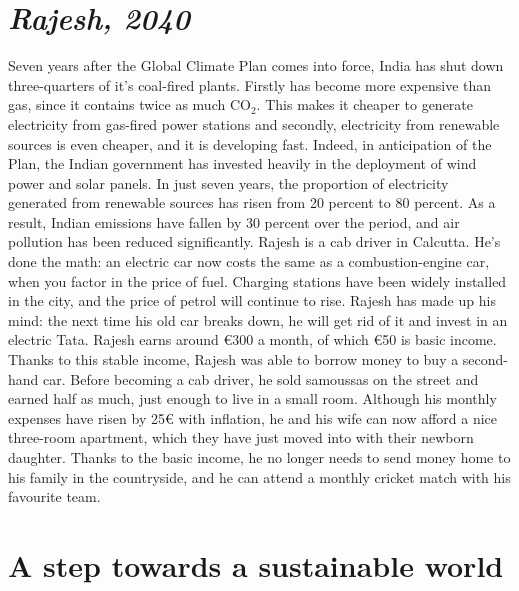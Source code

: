 \documentclass[a5paper,english,openany]{memoir}
\begin{document}
\chapter*{\textit{Rajesh, 2040}}\label{ch:narr_kolkata2}
Seven years after the Global Climate Plan comes into force,  India has shut down three-quarters of it's coal-fired plants. %
Firstly %
has become %
more expensive than gas, since it contains twice as much CO$_\text{2}$. This makes it cheaper to generate electricity from gas-fired power stations and secondly, %
electricity from renewable sources is even cheaper, and it is developing fast. Indeed, in anticipation of the Plan, the Indian government has invested heavily in the deployment of wind power and solar panels. In just seven years, the proportion of electricity generated from renewable sources has risen from 20 percent to 80 percent. As a result, Indian emissions have fallen by 30 percent over the period, and air pollution has been reduced significantly.
Rajesh is a cab driver in Calcutta. He's done the math: an electric car now costs the same as a combustion-engine car, when you factor in the price of fuel. Charging stations have been widely installed in the city, and the price of petrol will continue to rise. Rajesh has made up his mind: the next time his old car breaks down, he will get rid of it and invest in an electric Tata. Rajesh earns around \euro{}300 a month, of which \euro{}50 is basic income. Thanks to this stable income, Rajesh was able to borrow money to buy a second-hand car. %
Before becoming a cab driver, he sold samoussas on the street and earned half as much, just enough to live in a small room. Although his monthly expenses have risen by 25\euro{} with inflation, he and his wife can now afford a nice three-room apartment, which they have just moved into with their newborn daughter. Thanks to the basic income, he no longer needs to send money home to his family in the countryside, and he can attend a monthly cricket match with his favourite team.

\chapter{A step towards a sustainable world}\label{ch:premier_pas} %
\end{document}
